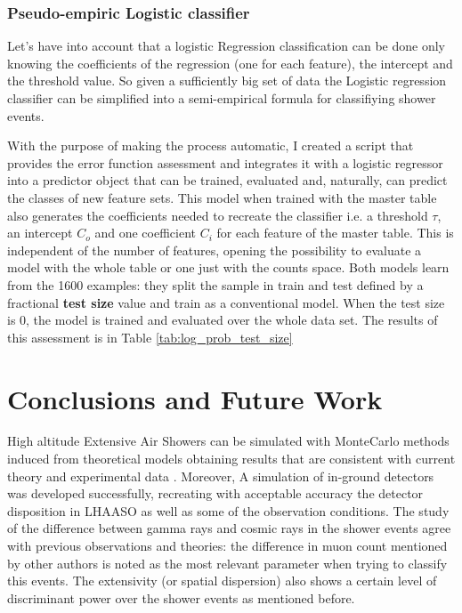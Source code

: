 \documentclass{article}
\begin{document}
\subsubsection{Pseudo-empiric Logistic classifier}
Let's have into account that a logistic Regression classification can be done only knowing the coefficients of the regression (one for each feature), the intercept and the threshold value. So given a sufficiently big set of data the Logistic regression classifier can be simplified into a semi-empirical formula for classifiying shower events.

With the purpose of making the process automatic, I created a script that provides the error function assessment and integrates it with a logistic regressor into a predictor object that can be trained, evaluated and, naturally, can predict the classes of new feature sets. This model when trained with the master table also generates the coefficients  needed to recreate the classifier i.e. a threshold $\tau$, an intercept $C_o$ and one coefficient $C_i$ for each feature of the master table. This is independent of the number of features, opening the possibility to evaluate a model with the whole table or one just with the counts space. Both models learn from the 1600 examples: they split the sample in train and test defined by a fractional \textbf{test size} value and train as a conventional model. When the test size is 0, the model is trained and evaluated over the whole data set. The results of this assessment is in Table \ref{tab:log_prob_test_size}



\section{Conclusions and Future Work}
High altitude Extensive Air Showers can be simulated with  MonteCarlo methods induced from theoretical models \cite{heitlerarticle} \cite{CORSIKA} obtaining results that are consistent with current theory and experimental data \cite{heitler1984quantum}. Moreover,
A simulation of in-ground detectors was developed successfully, recreating with acceptable accuracy the detector disposition in LHAASO as well as some of the observation conditions. The study of the difference between gamma rays and cosmic rays in the shower events agree with previous observations and theories:  the difference in muon count mentioned by other authors \cite{differencesgp} is noted as the most relevant parameter when trying to classify this events. The extensivity (or spatial dispersion) also shows a certain level of discriminant power over the shower events as mentioned before.
\end{document}
